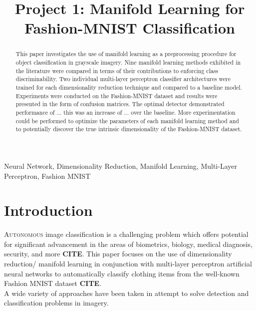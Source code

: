 \documentclass[conference]{IEEEtran}
\begin{document}
\title{Project 1: Manifold Learning for Fashion-MNIST Classification}
\author{

}

\maketitle


\begin{abstract}
	This paper investigates the use of manifold learning as a preprocessing procedure for object classification in grayscale imagery.  Nine manifold learning methods exhibited in the literature were compared in terms of their contributions to enforcing class discriminability.  Two individual multi-layer perceptron classifier architectures were trained for each dimensionality reduction technique and compared to a baseline model. Experiments were conducted on the Fashion-MNIST dataset and results were presented in the form of confusion matrices.  The optimal detector demonstrated performance of ... this was an increase of ... over the baseline.  More experimentation could be performed to optimize the parameters of each manifold learning method and to potentially discover the true intrinsic dimensionality of the Fashion-MNIST dataset.
\end{abstract} 

\begin{IEEEkeywords}
Neural Network, Dimensionality Reduction, Manifold Learning, Multi-Layer Perceptron, Fashion MNIST
\end{IEEEkeywords}


\section{Introduction} 

\lettrine{A}{utonomous} image classification is a challenging problem which offers potential for significant advancement in the areas of biometrics, biology, medical diagnosis, security, and more \textbf{CITE}.  This paper focuses on the use of dimensionality reduction/ manifold learning in conjunction with multi-layer perceptron artificial neural networks to automatically classify clothing items from the well-known Fashion MNIST dataset \textbf{CITE}.  \\
\indent A wide variety of approaches have been taken in attempt to solve detection and classification problems in imagery.
\end{document}
